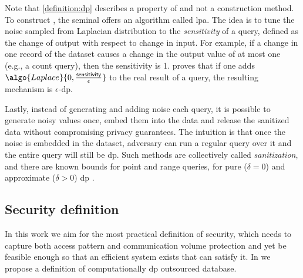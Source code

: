 				Note that \cref{definition:dp} describes a property of  and not a construction method.
				To construct , the seminal \cite{differential-privacy-original} offers an algorithm called \acrfull{lpa}.
				The idea is to tune the noise sampled from Laplacian distribution to the \emph{sensitivity} of a query, defined as the change of output with respect to change in input.
				For example, if a change in one record of the dataset causes a change in the output value of at most one (e.g., a count query), then the sensitivity is 1.
				\cite{differential-privacy-original} proves that if one adds $\algo{Laplace}{0, \frac{\mathsf{sensitivity}}{\epsilon}}$ to the real result of a query, the resulting mechanism is $\epsilon$-\acrshort{dp}.

				Lastly, instead of generating and adding noise each query, it is possible to generate noisy values once, embed them into the data and release the sanitized data without compromising privacy guarantees.
				The intuition is that once the noise is embedded in the dataset, adversary can run a regular query over it and the entire query will still be \acrshort{dp}.
				Such methods are collectively called \emph{sanitization}, and there are known bounds for point and range queries, for pure ($\delta = 0$) and approximate ($\delta > 0$) \acrshort{dp} \cite{bounds-on-sample-complexity,private-learning-and-sanitization,non-interactive-database-privacy,dp-under-observation,dp-release,privately-learning-thresholds}.

		\subsection{Security definition}

			In this work we aim for the most practical definition of security, which needs to capture both access pattern and communication volume protection and yet be feasible enough so that an efficient system exists that can satisfy it.
			In \epsolute{} \cite{epsolute} we propose a definition of computationally \acrshort{dp} outsourced database.

